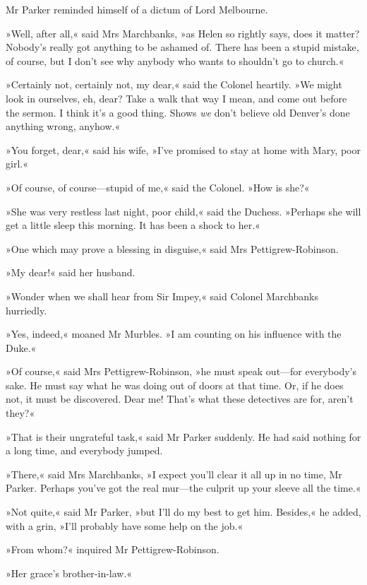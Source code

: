 Mr Parker reminded himself of a dictum of Lord Melbourne.

»Well, after all,« said Mrs Marchbanks, »as Helen so rightly says, does it matter? Nobody's really got anything to be ashamed of. There has been a stupid mistake, of course, but I don't see why anybody who wants to shouldn't go to church.«

»Certainly not, certainly not, my dear,« said the Colonel heartily. »We might look in ourselves, eh, dear? Take a walk that way I mean, and come out before the sermon. I think it's a good thing. Shows \textit{we} don't believe old Denver's done anything wrong, anyhow.«

»You forget, dear,« said his wife, »I've promised to stay at home with Mary, poor girl.«

»Of course, of course\allowbreak---\allowbreak stupid of me,« said the Colonel. »How is she?«

»She was very restless last night, poor child,« said the Duchess.  »Perhaps she will get a little sleep this morning. It has been a shock to her.«

»One which may prove a blessing in disguise,« said Mrs  Pettigrew-Robinson.

»My dear!« said her husband.

»Wonder when we shall hear from Sir Impey,« said Colonel Marchbanks hurriedly.

»Yes, indeed,« moaned Mr Murbles. »I am counting on his influence with the Duke.«

»Of course,« said Mrs Pettigrew-Robinson, »he must speak out\allowbreak---\allowbreak for everybody's sake. He must say what he was doing out of doors at that time. Or, if he does not, it must be discovered. Dear me! That's what these detectives are for, aren't they?«

»That is their ungrateful task,« said Mr Parker suddenly. He had said nothing for a long time, and everybody jumped.

»There,« said Mrs Marchbanks, »I expect you'll clear it all up in no time, Mr Parker. Perhaps you've got the real mur\allowbreak---\allowbreak the culprit up your sleeve all the time.«

»Not quite,« said Mr Parker, »but I'll do my best to get him.  Besides,« he added, with a grin, »I'll probably have some help on the job.«

»From whom?« inquired Mr Pettigrew-Robinson.

»Her grace's brother-in-law.«

